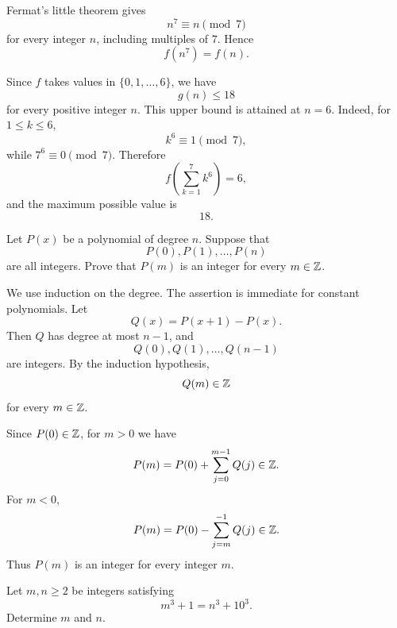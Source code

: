     \begin{solution}
        Fermat's little theorem gives
        \[
            n^7\equiv n\pmod7
        \]
        for every integer $n$, including multiples of $7$. Hence
        \[
            f(n^7)=f(n).
        \]

        Since $f$ takes values in $\{0,1,\ldots,6\}$, we have
        \[
            g(n)\leq18
        \]
        for every positive integer $n$. This upper bound is attained at $n=6$.
        Indeed, for $1\leq k\leq6$,
        \[
            k^6\equiv1\pmod7,
        \]
        while $7^6\equiv0\pmod7$. Therefore
        \[
            f\left(\sum_{k=1}^{7}k^6\right)=6,
        \]
        and the maximum possible value is
        \[
            \boxed{18}.
        \]
    \end{solution}

    \begin{expectedproblem}
        Let $P(x)$ be a polynomial of degree $n$. Suppose that
        \[
            P(0),P(1),\ldots,P(n)
        \]
        are all integers. Prove that $P(m)$ is an integer for every
        $m\in\mathbb{Z}$.
    \end{expectedproblem}

    \begin{solution}
        We use induction on the degree. The assertion is immediate for constant
        polynomials. Let
        \[
            Q(x)=P(x+1)-P(x).
        \]
        Then $Q$ has degree at most $n-1$, and
        \[
            Q(0),Q(1),\ldots,Q(n-1)
        \]
        are integers. By the induction hypothesis,
        \[
            Q(m)\in\mathbb{Z}
        \]
        for every $m\in\mathbb{Z}$.

        Since $P(0)\in\mathbb{Z}$, for $m>0$ we have
        \[
            P(m)
            =
            P(0)+\sum_{j=0}^{m-1}Q(j)
            \in\mathbb{Z}.
        \]
        For $m<0$,
        \[
            P(m)
            =
            P(0)-\sum_{j=m}^{-1}Q(j)
            \in\mathbb{Z}.
        \]
        Thus $P(m)$ is an integer for every integer $m$.
    \end{solution}

    \begin{expectedproblem}
        Let $m,n\geq2$ be integers satisfying
        \[
            m^3+1=n^3+10^3.
        \]
        Determine $m$ and $n$.
    \end{expectedproblem}

